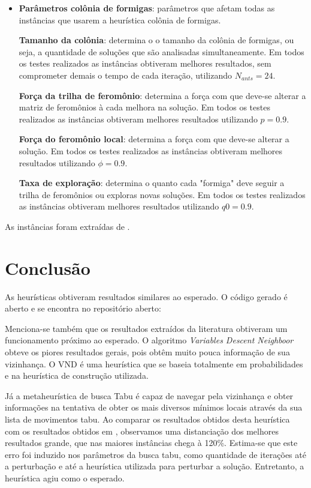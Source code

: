 \documentclass[conference,compsoc]{IEEEtran}
\begin{document}
\begin{itemize}
    \item \textbf{Parâmetros colônia de formigas}: parâmetros que afetam todas as instâncias que usarem a heurística colônia de formigas.
    
        \subitem \textbf{Tamanho da colônia}: determina o o tamanho da colônia de formigas, ou seja, a quantidade de soluções que são analisadas simultaneamente. Em todos os testes realizados as instâncias obtiveram melhores resultados, sem comprometer demais o tempo de cada iteração, utilizando $N_{ants} = 24$.
    
        \subitem \textbf{Força da trilha de feromônio}: determina a força com que deve-se alterar a matriz de feromônios à cada melhora na solução. Em todos os testes realizados as instâncias obtiveram melhores resultados utilizando $p = 0.9$.
    
        \subitem \textbf{Força do feromônio local}: determina a força com que deve-se alterar a solução. Em todos os testes realizados as instâncias obtiveram melhores resultados utilizando $\phi = 0.9$.
    
        \subitem \textbf{Taxa de exploração}: determina o quanto cada "formiga" deve seguir a trilha de feromônios ou exploras novas soluções. Em todos os testes realizados as instâncias obtiveram melhores resultados utilizando $q0 = 0.9$.
    
\end{itemize}

As instâncias foram extraídas de \cite{Jovanovic}.

\section{Conclusão}

As heurísticas obtiveram resultados similares ao esperado. O código gerado é aberto e se encontra no repositório aberto:


Menciona-se também que os resultados extraídos da literatura obtiveram um funcionamento próximo ao esperado. O algoritmo \textit{Variables Descent Neighboor} obteve os piores resultados gerais, pois obtêm muito pouca informação de sua vizinhança. O VND é uma heurística que se baseia totalmente em probabilidades e na heurística de construção utilizada.

Já a metaheurística de busca Tabu é capaz de navegar pela vizinhança e obter informações na tentativa de obter os mais diversos mínimos locais através da sua lista de movimentos tabu. Ao comparar os resultados obtidos desta heurística com os resultados obtidos em \cite{Mayra}, observamos uma distanciação dos melhores resultados grande, que nas maiores instâncias chega à 120\%. Estima-se que este erro foi induzido nos parâmetros da busca tabu, como quantidade de iterações até a perturbação e até a heurística utilizada para perturbar a solução. Entretanto, a heurística agiu como o esperado.
\end{document}
